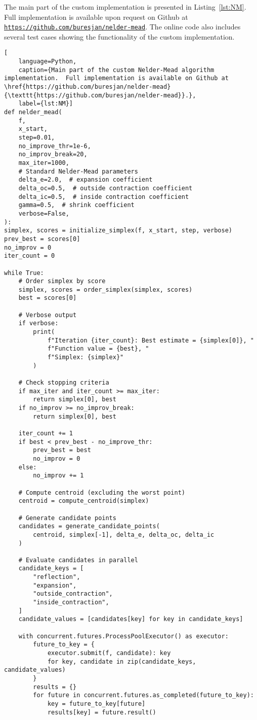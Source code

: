 The main part of the custom implementation is presented in Listing~\ref{lst:NM}. Full implementation is available upon request on Github at \href{https://github.com/buresjan/nelder-mead}{\texttt{https://github.com/buresjan/nelder-mead}}. The online code also includes several test cases showing the functionality of the custom implementation.

\newpage
\begin{lstlisting}[
	language=Python,
	caption={Main part of the custom Nelder-Mead algorithm implementation.  Full implementation is available on Github at \href{https://github.com/buresjan/nelder-mead}{\texttt{https://github.com/buresjan/nelder-mead}}.},
	label={lst:NM}]
def nelder_mead(
	f,
	x_start,
	step=0.01,
	no_improve_thr=1e-6,
	no_improv_break=20,
	max_iter=1000,
	# Standard Nelder-Mead parameters
	delta_e=2.0,  # expansion coefficient
	delta_oc=0.5,  # outside contraction coefficient
	delta_ic=0.5,  # inside contraction coefficient
	gamma=0.5,  # shrink coefficient
	verbose=False,
):
simplex, scores = initialize_simplex(f, x_start, step, verbose)
prev_best = scores[0]
no_improv = 0
iter_count = 0

while True:
	# Order simplex by score
	simplex, scores = order_simplex(simplex, scores)
	best = scores[0]

	# Verbose output
	if verbose:
		print(
			f"Iteration {iter_count}: Best estimate = {simplex[0]}, "
			f"Function value = {best}, "
			f"Simplex: {simplex}"
		)

	# Check stopping criteria
	if max_iter and iter_count >= max_iter:
		return simplex[0], best
	if no_improv >= no_improv_break:
		return simplex[0], best

	iter_count += 1
	if best < prev_best - no_improve_thr:
		prev_best = best
		no_improv = 0
	else:
		no_improv += 1
	
	# Compute centroid (excluding the worst point)
	centroid = compute_centroid(simplex)
	
	# Generate candidate points
	candidates = generate_candidate_points(
		centroid, simplex[-1], delta_e, delta_oc, delta_ic
	)
	
	# Evaluate candidates in parallel
	candidate_keys = [
		"reflection",
		"expansion",
		"outside_contraction",
		"inside_contraction",
	]
	candidate_values = [candidates[key] for key in candidate_keys]
	
	with concurrent.futures.ProcessPoolExecutor() as executor:
		future_to_key = {
			executor.submit(f, candidate): key
			for key, candidate in zip(candidate_keys, candidate_values)
		}
		results = {}
		for future in concurrent.futures.as_completed(future_to_key):
			key = future_to_key[future]
			results[key] = future.result()
	

\end{lstlisting}
